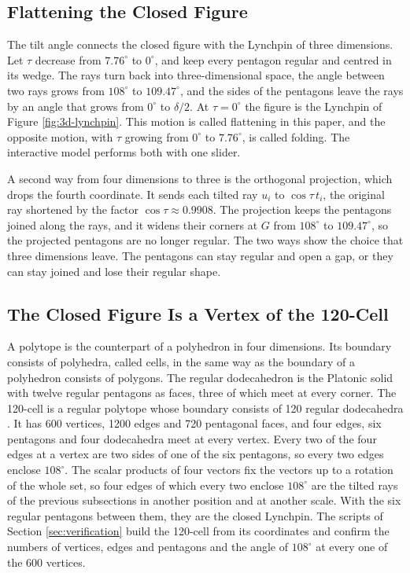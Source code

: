 \documentclass[a4paper,12pt]{article}
\begin{document}
\subsection{Flattening the Closed Figure}
The tilt angle connects the closed figure with the Lynchpin of three dimensions. Let \( \tau \) decrease from \( 7.76^\circ \) to \( 0^\circ \), and keep every pentagon regular and centred in its wedge. The rays turn back into three-dimensional space, the angle between two rays grows from \( 108^\circ \) to \( 109.47^\circ \), and the sides of the pentagons leave the rays by an angle that grows from \( 0^\circ \) to \( \delta/2 \). At \( \tau = 0^\circ \) the figure is the Lynchpin of Figure \ref{fig:3d-lynchpin}. This motion is called flattening in this paper, and the opposite motion, with \( \tau \) growing from \( 0^\circ \) to \( 7.76^\circ \), is called folding. The interactive model performs both with one slider.

A second way from four dimensions to three is the orthogonal projection, which drops the fourth coordinate. It sends each tilted ray \( u_i \) to \( \cos\tau \, t_i \), the original ray shortened by the factor \( \cos\tau \approx 0.9908 \). The projection keeps the pentagons joined along the rays, and it widens their corners at \( G \) from \( 108^\circ \) to \( 109.47^\circ \), so the projected pentagons are no longer regular. The two ways show the choice that three dimensions leave. The pentagons can stay regular and open a gap, or they can stay joined and lose their regular shape.

\subsection{The Closed Figure Is a Vertex of the 120-Cell}
A polytope is the counterpart of a polyhedron in four dimensions. Its boundary consists of polyhedra, called cells, in the same way as the boundary of a polyhedron consists of polygons. The regular dodecahedron is the Platonic solid with twelve regular pentagons as faces, three of which meet at every corner. The 120-cell is a regular polytope whose boundary consists of 120 regular dodecahedra \cite{coxeter}. It has 600 vertices, 1200 edges and 720 pentagonal faces, and four edges, six pentagons and four dodecahedra meet at every vertex. Every two of the four edges at a vertex are two sides of one of the six pentagons, so every two edges enclose \( 108^\circ \). The scalar products of four vectors fix the vectors up to a rotation of the whole set, so four edges of which every two enclose \( 108^\circ \) are the tilted rays of the previous subsections in another position and at another scale. With the six regular pentagons between them, they are the closed Lynchpin. The scripts of Section \ref{sec:verification} build the 120-cell from its coordinates and confirm the numbers of vertices, edges and pentagons and the angle of \( 108^\circ \) at every one of the 600 vertices.
\end{document}
